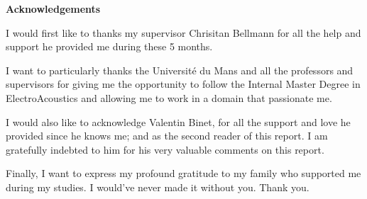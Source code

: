 \documentclass{report}
\begin{document}
\thispagestyle{empty}


\begin{center}
{\Large\textbf{Acknowledgements}} 
\end{center}
\vspace{1cm}
I would first like to thanks my supervisor Chrisitan Bellmann for all the help and support he provided me during these 5 months. 

\vspace{0.5cm}

I want to particularly thanks the Université du Mans and all the professors and supervisors for giving me the opportunity to follow the Internal Master Degree in ElectroAcoustics and allowing me to work in a domain that passionate me. 

\vspace{0.5cm}

I would also like to acknowledge Valentin Binet, for all the support and love he provided since he knows me; and as the second reader of this report. I am gratefully indebted to him for his very valuable comments on this report.

\vspace{0.5cm}

Finally, I want to express my profound gratitude to my family who supported me during my studies. I would've never made it without you. Thank you.





\vfill %


\clearpage
\renewcommand\contentsname{Table of contents}
\tableofcontents
{} %

\clearpage
\listoffigures
{}

\clearpage
\listofmyequations
{}

\end{document}
